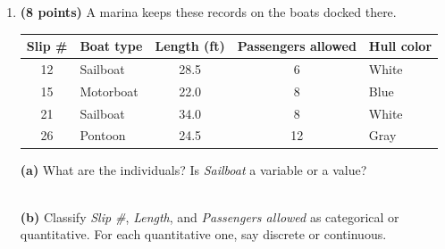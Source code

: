 \documentclass[12pt]{article}
\begin{document}
\vspace{0.06in}

\begin{enumerate}[leftmargin=1.9em, itemsep=0.10in, resume]

  \boxguard[22]
  \item \textbf{(8 points)} A marina keeps these records on the boats docked there.

        \vspace{3pt}
        {\centering\small
        \renewcommand{\arraystretch}{1.05}
        \begin{tabular}{@{} c l c c l @{}}
        \textbf{Slip \#} & \textbf{Boat type} & \textbf{Length (ft)} & \textbf{Passengers allowed} &
        \textbf{Hull color} \\ \hline
        12 & Sailboat  & 28.5 & 6  & White \\
        15 & Motorboat & 22.0 & 8  & Blue \\
        21 & Sailboat  & 34.0 & 8  & White \\
        26 & Pontoon   & 24.5 & 12 & Gray \\
        \end{tabular}\par}

        \vspace{3pt}
        \textbf{(a)} What are the individuals? Is \emph{Sailboat} a variable or a value?\\[2pt]
        \\

        \boxguard[15]
        \vspace{3pt}
        \textbf{(b)} Classify \emph{Slip \#}, \emph{Length}, and \emph{Passengers allowed} as
        categorical or quantitative. For each quantitative one, say discrete or continuous.\\[2pt]
        \\
        \\


\end{enumerate}
\end{document}
